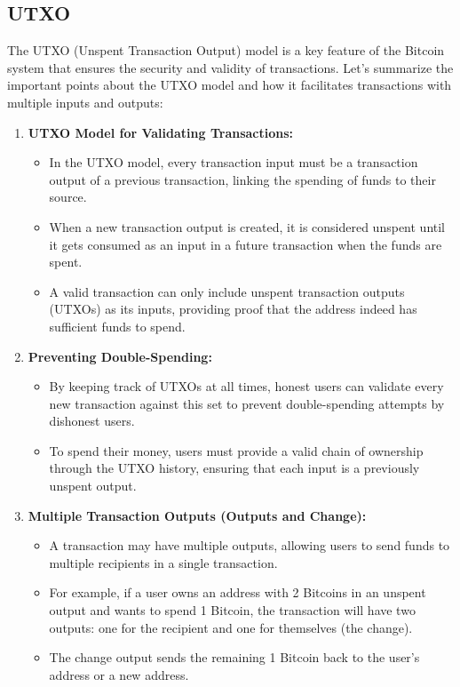 \subsection{UTXO}
The UTXO (Unspent Transaction Output) model is a key feature of the Bitcoin system that ensures the security and validity of transactions. Let's summarize the important points about the UTXO model and how it facilitates transactions with multiple inputs and outputs:
\begin{enumerate}
    \item \textbf{UTXO Model for Validating Transactions:} 
    \begin{itemize}
        \item In the UTXO model, every transaction input must be a transaction output of a previous transaction, linking the spending of funds to their source.
        \item When a new transaction output is created, it is considered unspent until it gets consumed as an input in a future transaction when the funds are spent.
        \item A valid transaction can only include unspent transaction outputs (UTXOs) as its inputs, providing proof that the address indeed has sufficient funds to spend.
    \end{itemize}
    \item \textbf{Preventing Double-Spending:}
    \begin{itemize}
        \item By keeping track of UTXOs at all times, honest users can validate every new transaction against this set to prevent double-spending attempts by dishonest users.
        \item To spend their money, users must provide a valid chain of ownership through the UTXO history, ensuring that each input is a previously unspent output.
    \end{itemize}
    \item \textbf{Multiple Transaction Outputs (Outputs and Change):}
    \begin{itemize}
        \item A transaction may have multiple outputs, allowing users to send funds to multiple recipients in a single transaction.
        \item For example, if a user owns an address with 2 Bitcoins in an unspent output and wants to spend 1 Bitcoin, the transaction will have two outputs: one for the recipient and one for themselves (the change).
        \item The change output sends the remaining 1 Bitcoin back to the user's address or a new address.

\end{itemize}
\end{enumerate}
